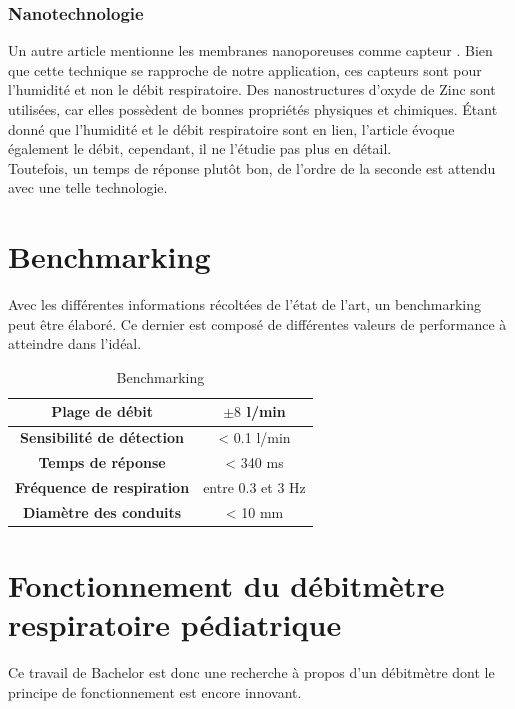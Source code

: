 \subsubsection{Nanotechnologie}
Un autre article mentionne les membranes nanoporeuses comme capteur \cite{moharamzadeh_fabrication_2018}. Bien que cette technique se rapproche 
de notre application, ces capteurs sont pour l'humidité et non le débit respiratoire. Des nanostructures d'oxyde de Zinc sont utilisées, car 
elles possèdent de bonnes propriétés physiques et chimiques. Étant donné que l'humidité et le débit respiratoire sont en lien, l'article évoque 
également le débit, cependant, il ne l'étudie pas plus en détail. \\
Toutefois, un temps de réponse plutôt bon, de l'ordre de la seconde est attendu avec une telle technologie. 

\section{Benchmarking}
Avec les différentes informations récoltées de l'état de l'art, un benchmarking peut être élaboré. Ce dernier est composé de différentes valeurs 
de performance à atteindre dans l'idéal. 

\begin{table}[H]
    \centering
    \begin{tabular}{|c|c|}
        \hline
        \textbf{Plage de débit}           & $\pm 8$ l/min     \\
        \hline
        \textbf{Sensibilité de détection} & < 0.1 l/min       \\
        \hline
        \textbf{Temps de réponse}         & < 340 ms          \\
        \hline
        \textbf{Fréquence de respiration} & entre 0.3 et 3 Hz \\
        \hline
        \textbf{Diamètre des conduits}    & < 10 mm           \\
        \hline
    \end{tabular}
    \caption{Benchmarking}
    \label{fig:benchmarking}
\end{table}


\section{Fonctionnement du débitmètre respiratoire pédiatrique}
Ce travail de Bachelor est donc une recherche à propos d'un débitmètre dont le principe de fonctionnement est encore innovant. \\

